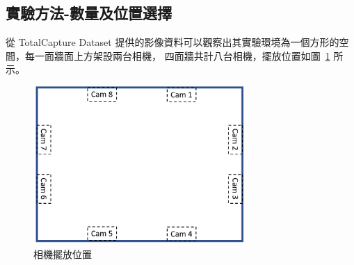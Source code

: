 \subsection{實驗方法-數量及位置選擇}
從 TotalCapture Dataset 提供的影像資料可以觀察出其實驗環境為一個方形的空間，每一面牆面上方架設兩台相機，
四面牆共計八台相機，擺放位置如圖~\ref{ch3_fig_cameraset_totalcap} 所示。
\begin{figure}[!ht]
   \centering
   \includegraphics[width=8cm]{figure/ch3_fig_cameraset_totalcap.png}
    \caption[相機擺放位置]{相機擺放位置}
    \label{ch3_fig_cameraset_totalcap}
\end{figure}

